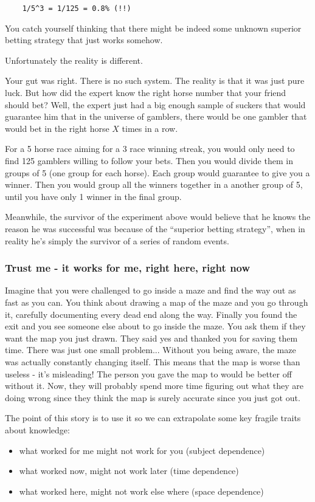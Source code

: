 \documentclass{article}
\begin{document}
\begin{lstlisting}
	1/5^3 = 1/125 = 0.8% (!!)
\end{lstlisting}

You catch yourself thinking that there might be indeed some unknown superior betting strategy that just works somehow.

Unfortunately the reality is different.

Your gut was right. There is no such system. The reality is that it was just pure luck. 
But how did the expert know the right horse number that your friend should bet? 
Well, the expert just had a big enough sample of suckers that would guarantee him that in the universe of gamblers, there would be one gambler that would bet in the right horse $X$ times in a row. 

For a 5 horse race aiming for a 3 race winning streak, you would only need to find 125 gamblers willing to follow your bets. Then you would divide them in groups of 5 (one group for each horse). Each group would guarantee to give you a winner. Then you would group all the winners together in a another group of 5, until you have only 1 winner in the final group.

Meanwhile, the survivor of the experiment above would believe that he knows the reason he was successful was because of the ``superior betting strategy'', when in reality he's simply the survivor of a series of random events.

\subsubsection{Trust me - it works for me, right here, right now}

Imagine that you were challenged to go inside a maze and find the way out as fast as you can. You think about drawing a map of the maze and you go through it, carefully documenting every dead end along the way. Finally you found the exit and you see someone else about to go inside the maze. You ask them if they want the map you just drawn. They said yes and thanked you for saving them time. There was just one small problem... Without you being aware, the maze was actually constantly changing itself. This means that the map is worse than useless - it's misleading! The person you gave the map to would be better off without it. Now, they will probably spend more time figuring out what they are doing wrong since they think the map is surely accurate since you just got out.

The point of this story is to use it so we can extrapolate some key fragile traits about knowledge: 
\begin{itemize}
	\item what worked for me might not work for you (subject dependence)
	\item  what worked now, might not work later (time dependence)
	\item  what worked here, might not work else where (space dependence)
\end{itemize}
\end{document}
